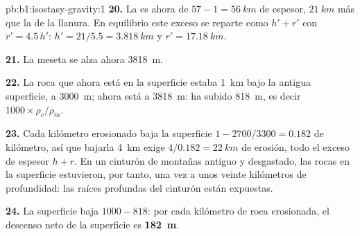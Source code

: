 \begin{solution}{pb:b1:isostasy-gravity:1}
\textbf{20.} La  es ahora de $57 - 1 = \qty{56}{km}$ de espesor, $\qty{21}{km}$
más que la de la llanura. En equilibrio este exceso se reparte como $h' + r'$ con
$r' = 4.5\,h'$: $h' = 21/5.5 = \qty{3.818}{km}$ y $r' = \qty{17.18}{km}$.

\textbf{21.} La meseta se alza ahora \qty{3818}{m}.

\textbf{22.} La roca que ahora está en la superficie estaba \qty{1}{km} bajo la antigua superficie,
a \qty{3000}{m}; ahora está a \qty{3818}{m}: ha subido \qty{818}{m}, es decir $1000\times\rho_c/\rho_m$.

\textbf{23.} Cada kilómetro erosionado baja la superficie $1 - 2700/3300 =
0.182$ de kilómetro, así que bajarla \qty{4}{km} exige
$4/0.182 = \qty{22}{km}$ de erosión, todo el exceso de espesor $h + r$. En un
cinturón de montañas antiguo y desgastado, las rocas en la superficie estuvieron, por tanto, una vez a unos
veinte kilómetros de profundidad: las raíces profundas del cinturón están expuestas.

\textbf{24.} La superficie baja $1000 - 818$: por cada kilómetro de roca erosionada, el descenso neto de la superficie es
\textbf{\qty[text-series-to-math=true]{182}{m}}.
\end{solution}

